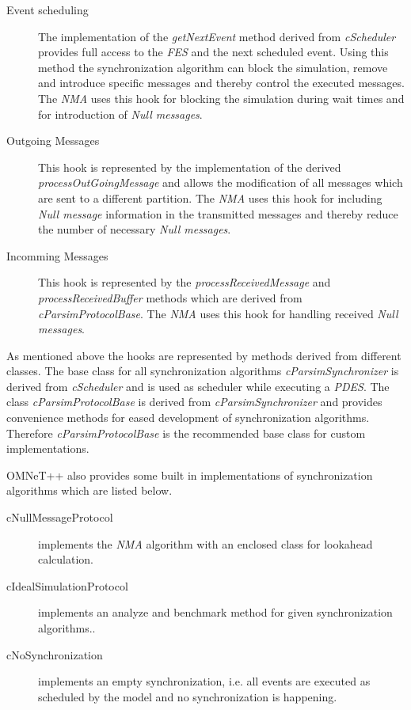 \begin{description}
    \item[Event scheduling] The implementation of the \emph{getNextEvent} method derived from \emph{cScheduler} provides full access to the \emph{FES} and the next scheduled event.
    Using this method the synchronization algorithm can block the simulation, remove and introduce specific messages and thereby control the executed messages.
    The \emph{NMA} uses this hook for blocking the simulation during wait times and for introduction of \emph{Null messages}.
    \item[Outgoing Messages] This hook is represented by the implementation of the derived \emph{processOutGoingMessage} and allows the modification of all messages which are sent to a different partition.
    The \emph{NMA} uses this hook for including \emph{Null message} information in the transmitted messages and thereby reduce the number of necessary \emph{Null messages}.
    \item[Incomming Messages] This hook is represented by the \emph{processReceivedMessage} and \emph{processReceivedBuffer} methods which are derived from \emph{cParsimProtocolBase}.
    The \emph{NMA} uses this hook for handling received \emph{Null messages}.
\end{description}

As mentioned above the hooks are represented by methods derived from different classes.
The base class for all synchronization algorithms \emph{cParsimSynchronizer} is derived from \emph{cScheduler} and is used as scheduler while executing a \emph{PDES}.
The class \emph{cParsimProtocolBase} is derived from \emph{cParsimSynchronizer} and provides convenience methods for eased development of synchronization algorithms.
Therefore \emph{cParsimProtocolBase} is the recommended base class for custom implementations.

OMNeT++ also provides some built in implementations of synchronization algorithms which are listed below. \cite[section 16.3.5]{omnet_manual}

\begin{description}
    \item[cNullMessageProtocol] implements the \emph{NMA} algorithm with an enclosed class for lookahead calculation.
    \item[cIdealSimulationProtocol] implements an analyze and benchmark method for given synchronization algorithms.\cite[section 3]{bagrodia_performance_2000}.
    \item[cNoSynchronization] implements an empty synchronization, i.e. all events are executed as scheduled by the model and no synchronization is happening.
\end{description}

